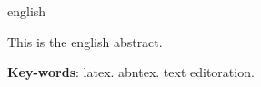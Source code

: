 \begin{resumo}[Abstract]
\begin{otherlanguage*}{english}

This is the english abstract.

\vspace{\onelineskip}
\noindent
\textbf{Key-words}: latex. abntex. text editoration.
\end{otherlanguage*}
\end{resumo}
